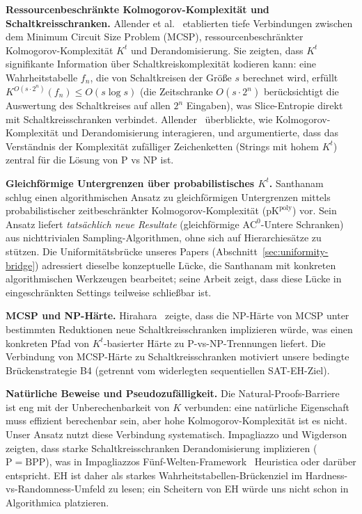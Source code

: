 \documentclass[aps,prd,twocolumn,superscriptaddress,nofootinbib]{revtex4-2}
\theoremstyle{definition}
\theoremstyle{remark}
\begin{document}
\textbf{Ressourcenbeschränkte Kolmogorov-Komplexität und Schaltkreisschranken.}
Allender et al.~\cite{Allender2006} etablierten tiefe Verbindungen zwischen dem Minimum Circuit Size Problem (MCSP), ressourcenbeschränkter Kolmogorov-Komplexität $K^t$ und Derandomisierung. Sie zeigten, dass $K^t$ signifikante Information über Schaltkreiskomplexität kodieren kann: eine Wahrheitstabelle $f_n$, die von Schaltkreisen der Größe $s$ berechnet wird, erfüllt $K^{O(s \cdot 2^n)}(f_n) \leq O(s \log s)$ (die Zeitschranke $O(s \cdot 2^n)$ berücksichtigt die Auswertung des Schaltkreises auf allen $2^n$ Eingaben), was Slice-Entropie direkt mit Schaltkreisschranken verbindet. Allender~\cite{Allender2001} überblickte, wie Kolmogorov-Komplexität und Derandomisierung interagieren, und argumentierte, dass das Verständnis der Komplexität \glqq zufälliger Zeichenketten\grqq{} (Strings mit hohem $K^t$) zentral für die Lösung von P vs NP ist.

\textbf{Gleichförmige Untergrenzen über probabilistisches $K^t$.}
Santhanam~\cite{Santhanam2023} schlug einen algorithmischen Ansatz zu gleichförmigen Untergrenzen mittels probabilistischer zeitbeschränkter Kolmogorov-Komplexität ($\mathrm{pK}^{\mathrm{poly}}$) vor. Sein Ansatz liefert \emph{tatsächlich neue Resultate} (gleichförmige $\mathrm{AC}^0$-Untere Schranken) aus nichttrivialen Sampling-Algorithmen, ohne sich auf Hierarchiesätze zu stützen. Die Uniformitätsbrücke unseres Papers (Abschnitt~\ref{sec:uniformity-bridge}) adressiert dieselbe konzeptuelle Lücke, die Santhanam mit konkreten algorithmischen Werkzeugen bearbeitet; seine Arbeit zeigt, dass diese Lücke in eingeschränkten Settings teilweise schließbar ist.

\textbf{MCSP und NP-Härte.}
Hirahara~\cite{Hirahara2018} zeigte, dass die NP-Härte von MCSP unter bestimmten Reduktionen neue Schaltkreisschranken implizieren würde, was einen konkreten Pfad von $K^t$-basierter Härte zu P-vs-NP-Trennungen liefert. Die Verbindung von MCSP-Härte zu Schaltkreisschranken motiviert unsere bedingte Brückenstrategie B4 (getrennt vom widerlegten sequentiellen SAT-EH-Ziel).

\textbf{Natürliche Beweise und Pseudozufälligkeit.}
Die Natural-Proofs-Barriere~\cite{RazborovRudich1997} ist eng mit der Unberechenbarkeit von $K$ verbunden: eine \glqq natürliche\grqq{} Eigenschaft muss effizient berechenbar sein, aber hohe Kolmogorov-Komplexität ist es nicht. Unser Ansatz nutzt diese Verbindung systematisch. Impagliazzo und Wigderson~\cite{ImpagliazzoWigderson1997} zeigten, dass starke Schaltkreisschranken Derandomisierung implizieren ($\mathrm{P} = \mathrm{BPP}$), was in Impagliazzos \glqq Fünf-Welten\grqq{}-Framework~\cite{Impagliazzo1995} Heuristica oder darüber entspricht. EH ist daher als starkes Wahrheitstabellen-Brückenziel im Hardness-vs-Randomness-Umfeld zu lesen; ein Scheitern von EH würde uns nicht schon in Algorithmica platzieren.
\end{document}
